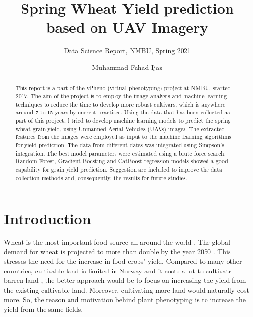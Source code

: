 \documentclass[sigconf, nonacm, natbib, screen, balance=False]{acmart}
\begin{document}
\title{Spring Wheat Yield prediction based on UAV Imagery}
\subtitle{Data Science Report, NMBU, Spring 2021}

\author{Muhammad Fahad Ijaz}

\begin{abstract}
  This report is a part of the vPheno (virtual phenotyping) project at NMBU, started 2017. The aim of the project is to employ the image analysis and machine learning techniques to reduce the time to develop more robust cultivars, which is anywhere around 7 to 15 years by current practices. Using the data that has been collected as part of this project, I tried to develop machine learning models to predict the spring wheat grain yield, using Unmanned Aerial Vehicles (UAVs) images. The extracted features from the images were employed as input to the machine learning algorithms for yield prediction. The data from different dates was integrated using Simpson's integration. The best model parameters were estimated using a brute force search. Random Forest, Gradient Boosting and CatBoost regression models showed a good capability for grain yield prediction. Suggestion are included to improve the data collection methods and, consequently, the results for future studies.
\end{abstract}

\maketitle

\section{Introduction}\label{sec:intro}

Wheat is the most important food source all around the world \citep{Igrejas2020}. The global demand for wheat is projected to more than double by the year 2050 \citep{tilman}. This stresses the need for the increase in food crops' yield. Compared to many other countries, cultivable land is limited in Norway and it costs a lot to cultivate barren land \citep{Soilcons7:online}, the better approach would be to focus on increasing the yield from the existing cultivable land. Moreover, cultivating more land would naturally cost more. So, the reason and motivation behind plant phenotyping is to increase the yield from the same fields. 
\end{document}

